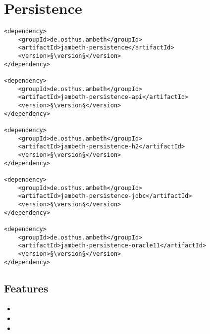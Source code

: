 \section{Persistence}
\label{module:Persistence}
\ClearAPI
\TODO
\begin{lstlisting}[style=POM,caption={Maven modules to use \emph{Ambeth Persistence}}]
<dependency>
	<groupId>de.osthus.ambeth</groupId>
	<artifactId>jambeth-persistence</artifactId>
	<version>§\version§</version>
</dependency>

<dependency>
	<groupId>de.osthus.ambeth</groupId>
	<artifactId>jambeth-persistence-api</artifactId>
	<version>§\version§</version>
</dependency>

<dependency>
	<groupId>de.osthus.ambeth</groupId>
	<artifactId>jambeth-persistence-h2</artifactId>
	<version>§\version§</version>
</dependency>

<dependency>
	<groupId>de.osthus.ambeth</groupId>
	<artifactId>jambeth-persistence-jdbc</artifactId>
	<version>§\version§</version>
</dependency>

<dependency>
	<groupId>de.osthus.ambeth</groupId>
	<artifactId>jambeth-persistence-oracle11</artifactId>
	<version>§\version§</version>
</dependency>
\end{lstlisting}
\subsection{Features}
\begin{itemize}
	\item {}
	\item {}
	\item {}
\end{itemize}

